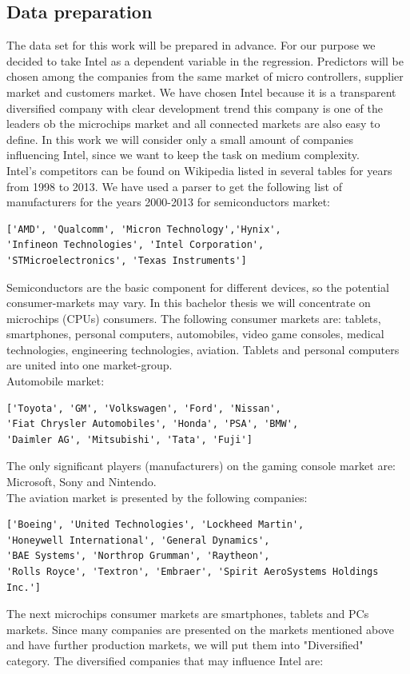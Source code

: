 \documentclass[
  twoside,
  12pt, a4paper,
  footinclude=true,
  headinclude=true,
  cleardoublepage=empty
]{article}
\begin{document}
\subsection{Data preparation}
The data set for this work will be prepared in advance. For our purpose we decided to take Intel as a dependent variable in the regression. Predictors will be chosen among the companies from the same market of micro controllers, supplier market and customers market. We have chosen Intel because it is a transparent diversified company with clear development trend this company is one of the leaders ob the microchips market and all connected markets are also easy to define. In this work we will consider only a small amount of companies influencing Intel, since we want to keep the task on medium complexity.\\
Intel's competitors can be found on Wikipedia listed in several tables for years from 1998 to 2013. We have used a parser to get the following list of manufacturers for the years 2000-2013 for semiconductors market:
\begin{verbatim}
['AMD', 'Qualcomm', 'Micron Technology','Hynix',
'Infineon Technologies', 'Intel Corporation', 
'STMicroelectronics', 'Texas Instruments']
\end{verbatim}
Semiconductors are the basic component for different devices, so the potential consumer-markets may vary. In this bachelor thesis we will concentrate on microchips (CPUs) consumers. The following consumer markets are: tablets, smartphones, personal computers, automobiles, video game consoles, medical technologies, engineering technologies, aviation. Tablets and personal computers are united into one market-group.\\
Automobile market:
\begin{verbatim}
['Toyota', 'GM', 'Volkswagen', 'Ford', 'Nissan', 
'Fiat Chrysler Automobiles', 'Honda', 'PSA', 'BMW',
'Daimler AG', 'Mitsubishi', 'Tata', 'Fuji']
\end{verbatim}
The only significant players (manufacturers) on the gaming console market are: Microsoft, Sony and Nintendo.\\ 
The aviation market is presented by the following companies: 
\begin{verbatim}
['Boeing', 'United Technologies', 'Lockheed Martin',
'Honeywell International', 'General Dynamics',
'BAE Systems', 'Northrop Grumman', 'Raytheon',
'Rolls Royce', 'Textron', 'Embraer', 'Spirit AeroSystems Holdings Inc.']
\end{verbatim}
The next microchips consumer markets are smartphones, tablets and PCs markets. Since many companies are presented on the markets mentioned above and have further production markets, we will put them into "Diversified" category. The diversified companies that may influence Intel are:
\end{document}
